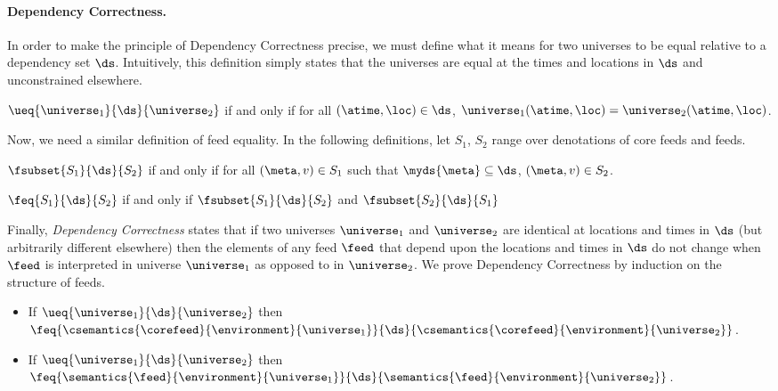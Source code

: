 \paragraph*{Dependency Correctness.}  
In order to make the principle of Dependency Correctness
precise, we must define what it means for two universes
to be equal relative to a dependency set $\ds$.  Intuitively,
this definition simply states that the universes are equal at the
times and locations in $\ds$ and unconstrained elsewhere.

\begin{definition}
$\ueq{\universe_1}{\ds}{\universe_2}$ if and only if for all
$(\atime,\loc) \in \ds$, $\universe_1(\atime,\loc) = \universe_2(\atime,\loc)$.
\end{definition}

\noindent
Now, we need a similar definition of feed equality.  In the following
definitions, let $S_1$, $S_2$ range over denotations of core feeds and feeds.

\begin{definition}
$\fsubset{S_1}{\ds}{S_2}$ if and only if for all
$(\meta,v) \in S_1$ such that
$\myds{\meta} \subseteq \ds$, $(\meta,v) \in S_2$.
\end{definition}

\begin{definition}
$\feq{S_1}{\ds}{S_2}$ if and only if 
$\fsubset{S_1}{\ds}{S_2}$ and
$\fsubset{S_2}{\ds}{S_1}$
\end{definition}

\noindent
Finally, {\em Dependency Correctness} states that if two universes
$\universe_1$ and $\universe_2$ are identical at locations and times in $\ds$
(but arbitrarily different elsewhere) then the elements of any feed $\feed$
that depend upon the locations and times in $\ds$ do not change when
$\feed$ is interpreted in universe $\universe_1$ 
as opposed to in $\universe_2$.  We prove Dependency Correctness
by induction on the structure of feeds.  

\begin{theorem}
\begin{itemize}
\item
If $\ueq{\universe_1}{\ds}{\universe_2}$ then
$\feq{\csemantics{\corefeed}{\environment}{\universe_1}}{\ds}{\csemantics{\corefeed}{\environment}{\universe_2}}$.
\item 
If $\ueq{\universe_1}{\ds}{\universe_2}$ then
$\feq{\semantics{\feed}{\environment}{\universe_1}}{\ds}{\semantics{\feed}{\environment}{\universe_2}}$.
\end{itemize}
\end{theorem}







